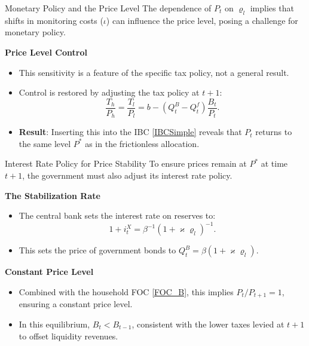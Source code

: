 \documentclass[11pt,aspectratio=169]{beamer}
\begin{document}
\begin{frame}{Monetary Policy and the Price Level}
\small
The dependence of $P_t$ on $\varrho_l$ implies that shifts in monitoring costs ($\iota$) can influence the price level, posing a challenge for monetary policy.

\vspace{0.2cm}
\textbf{Price Level Control}
\begin{itemize}
    \item This sensitivity is a feature of the specific tax policy, not a general result.
    \item Control is restored by adjusting the tax policy at $t+1$:
    \begin{equation*}
    \frac{T_{h}}{P_{h}}=\frac{T_{l}}{P_{l}}=b-(Q_{t}^{B}-Q_{t}^{f})\frac{B_{t}}{P_{t}}.
    \end{equation*}
    \item \textbf{Result}: Inserting this into the IBC \eqref{IBCSimple} reveals that $P_t$ returns to the same level $P^*$ as in the frictionless allocation.
\end{itemize}
\end{frame}

\begin{frame}{Interest Rate Policy for Price Stability}
\small
To ensure prices remain at $P^*$ at time $t+1$, the government must also adjust its interest rate policy.

\vspace{0.3cm}
\textbf{The Stabilization Rate}
\begin{itemize}
    \item The central bank sets the interest rate on reserves to:
    \begin{equation*}
    1+i_{t}^{X}=\beta ^{-1}\left( 1+\varkappa \varrho _{l}\right) ^{-1}.
    \end{equation*}
    \item This sets the price of government bonds to $Q_{t}^{B}=\beta \left( 1+\varkappa \varrho _{l}\right)$.
\end{itemize}

\vspace{0.3cm}
\textbf{Constant Price Level}
\begin{itemize}
    \item Combined with the household FOC \eqref{FOC_B}, this implies $P_t/P_{t+1} = 1$, ensuring a constant price level.
    \item In this equilibrium, $B_t < B_{t-1}$, consistent with the lower taxes levied at $t+1$ to offset liquidity revenues.
\end{itemize}
\end{frame}
\end{document}
